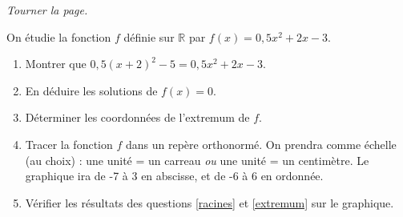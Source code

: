\documentclass[11pt]{article}
\begin{document}
\hfill\emph{Tourner la page.}
\newpage

\begin{exercice}
  On étudie la fonction $f$ définie sur $\mathbb{R}$ par $f(x)=0,5x^2+2x-3$.
  \begin{enumerate}
    \item Montrer que $0,5(x+2)^2-5=0,5x^2+2x-3$.
    \item\label{racines} En déduire les solutions de $f(x)=0$.
    \item\label{extremum} Déterminer les coordonnées de l'extremum de $f$.
    \item Tracer la fonction $f$ dans un repère orthonormé. On prendra comme échelle (au choix) : une unité = un carreau \emph{ou} une unité = un centimètre. Le graphique ira de -7 à 3 en abscisse, et de -6 à 6 en ordonnée.
    \item Vérifier les résultats des questions \ref{racines} et \ref{extremum} sur le graphique.
  \end{enumerate}
\end{exercice}
\end{document}
